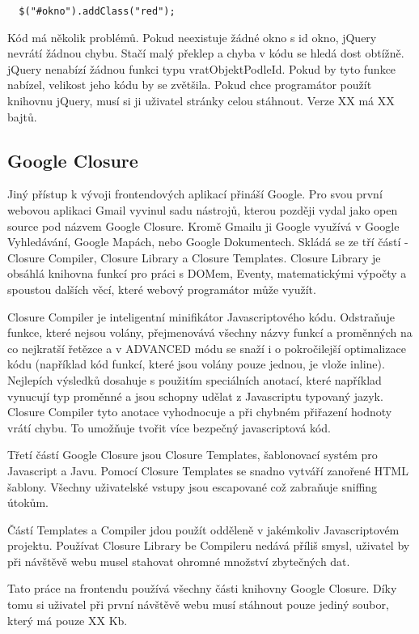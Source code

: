 \begin{lstlisting}
  $("#okno").addClass("red");
\end{lstlisting}

Kód má několik problémů. Pokud neexistuje žádné okno s id okno, jQuery nevrátí žádnou chybu. Stačí malý překlep a chyba v kódu se hledá dost obtížně. jQuery nenabízí žádnou funkci typu vratObjektPodleId. Pokud by tyto funkce nabízel, velikost jeho kódu by se zvětšila. Pokud chce programátor použít knihovnu jQuery, musí si ji uživatel stránky celou stáhnout. Verze XX má XX bajtů.

\subsection{Google Closure}
Jiný přístup k vývoji frontendových aplikací přináší Google. Pro svou první webovou aplikaci Gmail vyvinul sadu nástrojů, kterou později vydal jako open source pod názvem Google Closure. Kromě Gmailu ji Google využívá v Google Vyhledávání, Google Mapách, nebo Google Dokumentech. Skládá se ze tří částí - Closure Compiler, Closure Library a Closure Templates. Closure Library je obsáhlá knihovna funkcí pro práci s DOMem, Eventy, matematickými výpočty a spoustou dalších věcí, které webový programátor může využít.

Closure Compiler je inteligentní minifikátor Javascriptového kódu. Odstraňuje funkce, které nejsou volány, přejmenovává všechny názvy funkcí a proměnných na co nejkratší řetězce a v ADVANCED módu se snaží i o pokročilejší optimalizace kódu (například kód funkcí, které jsou volány pouze jednou, je vlože inline). Nejlepích výsledků dosahuje s použitím speciálních anotací, které například vynucují typ proměnné a jsou schopny udělat z Javascriptu typovaný jazyk. Closure Compiler tyto anotace vyhodnocuje a při chybném přiřazení hodnoty vrátí chybu. To umožňuje tvořit více bezpečný javascriptová kód.

Třetí částí Google Closure jsou Closure Templates, šablonovací systém pro Javascript a Javu. Pomocí Closure Templates se snadno vytváří zanořené HTML šablony. Všechny uživatelské vstupy jsou escapované což zabraňuje sniffing útokům.

Částí Templates a Compiler jdou použít odděleně v jakémkoliv Javascriptovém projektu. Používat Closure Library be Compileru nedává příliš smysl, uživatel by při návštěvě webu musel stahovat ohromné množství zbytečných dat.

Tato práce na frontendu používá všechny části knihovny Google Closure. Díky tomu si uživatel při první návštěvě webu musí stáhnout pouze jediný soubor, který má pouze XX Kb.

